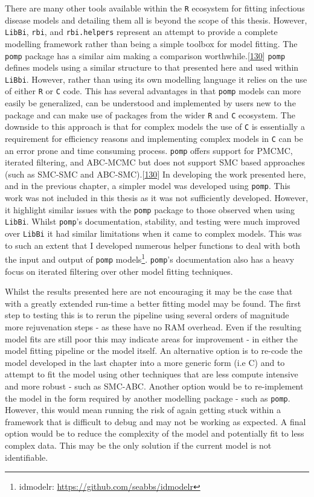 \documentclass[11pt,twoside]{bristolthesis}
\begin{document}
  There are many other tools available within the \texttt{R} ecosystem for fitting infectious disease models and detailing them all is beyond the scope of this thesis. However, \texttt{LibBi}, \texttt{rbi}, and \texttt{rbi.helpers} represent an attempt to provide a complete modelling framework rather than being a simple toolbox for model fitting. The \texttt{pomp} package has a similar aim making a comparison worthwhile.{[}\protect\hyperlink{ref-King2016}{130}{]} \texttt{pomp} defines models using a similar structure to that presented here and used within \texttt{LiBbi}. However, rather than using its own modelling language it relies on the use of either \texttt{R} or \texttt{C} code. This has several advantages in that \texttt{pomp} models can more easily be generalized, can be understood and implemented by users new to the package and can make use of packages from the wider \texttt{R} and \texttt{C} ecosystem. The downside to this approach is that for complex models the use of \texttt{C} is essentially a requirement for efficiency reasons and implementing complex models in \texttt{C} can be an error prone and time consuming process. \texttt{pomp} offers support for PMCMC, iterated filtering, and ABC-MCMC but does not support SMC based approaches (such as SMC-SMC and ABC-SMC).{[}\protect\hyperlink{ref-King2016}{130}{]} In developing the work presented here, and in the previous chapter, a simpler model was developed using \texttt{pomp}. This work was not included in this thesis as it was not sufficiently developed. However, it highlight similar issues with the \texttt{pomp} package to those observed when using \texttt{LibBi}. Whilst \texttt{pomp}'s documentation, stability, and testing were much improved over \texttt{LibBi} it had similar limitations when it came to complex models. This was to such an extent that I developed numerous helper functions to deal with both the input and output of \texttt{pomp} models\footnote{idmodelr: \url{https://github.com/seabbs/idmodelr}}. \texttt{pomp}'s documentation also has a heavy focus on iterated filtering over other model fitting techniques.
  
  Whilst the results presented here are not encouraging it may be the case that with a greatly extended run-time a better fitting model may be found. The first step to testing this is to rerun the pipeline using several orders of magnitude more rejuvenation steps - as these have no RAM overhead. Even if the resulting model fits are still poor this may indicate areas for improvement - in either the model fitting pipeline or the model itself. An alternative option is to re-code the model developed in the last chapter into a more generic form (i.e C) and to attempt to fit the model using other techniques that are less compute intensive and more robust - such as SMC-ABC. Another option would be to re-implement the model in the form required by another modelling package - such as \texttt{pomp}. However, this would mean running the risk of again getting stuck within a framework that is difficult to debug and may not be working as expected. A final option would be to reduce the complexity of the model and potentially fit to less complex data. This may be the only solution if the current model is not identifiable.
  
\end{document}
